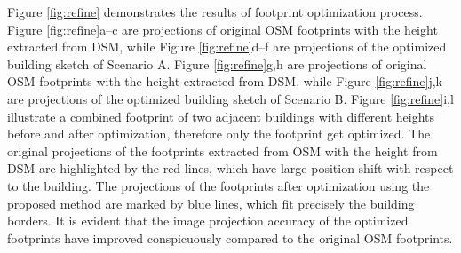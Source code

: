 \documentclass[remotesensing,article,accept,moreauthors,pdftex,10pt,a4paper]{mdpi}
\theoremstyle{mdpi}
\newcounter{ex}
\newcounter{re}
\begin{document}
Figure \ref{fig:refine} demonstrates the results of footprint optimization process. Figure \ref{fig:refine}a--c are projections of original OSM footprints with the height extracted from DSM, while Figure \ref{fig:refine}d--f are projections of the optimized building sketch of Scenario A. Figure \ref{fig:refine}g,h are projections of original OSM footprints with the height extracted from DSM, while Figure \ref{fig:refine}j,k are projections of the optimized building sketch of Scenario B. Figure \ref{fig:refine}i,l illustrate a combined footprint of two adjacent buildings with different heights before and after optimization, therefore only the footprint get optimized. The original projections of the footprints extracted from OSM with the height from DSM are highlighted by the red lines, which have large position shift with respect to the building. The projections of the footprints after optimization using the proposed method are marked by blue lines, which fit precisely the building borders. It is evident that the image projection accuracy of the optimized footprints have improved conspicuously compared to the original OSM footprints. 
\end{document}
